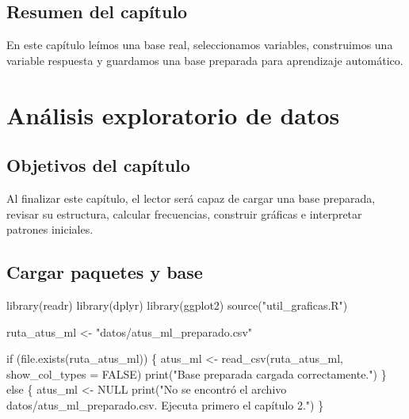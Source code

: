 \documentclass[
  spanish,
  11pt,
  letterpaper,
]{book}
\newenvironment{Shaded}{}{}
\newcommand{\AttributeTok}[1]{\textcolor[rgb]{0.84,0.23,0.29}{#1}}
\newcommand{\ConstantTok}[1]{\textcolor[rgb]{0.00,0.36,0.77}{#1}}
\newcommand{\ControlFlowTok}[1]{\textcolor[rgb]{0.84,0.23,0.29}{#1}}
\newcommand{\FunctionTok}[1]{\textcolor[rgb]{0.44,0.26,0.76}{#1}}
\newcommand{\NormalTok}[1]{\textcolor[rgb]{0.14,0.16,0.18}{#1}}
\newcommand{\OtherTok}[1]{\textcolor[rgb]{0.44,0.26,0.76}{#1}}
\newcommand{\StringTok}[1]{\textcolor[rgb]{0.01,0.18,0.38}{#1}}
\begin{document}
\section{Resumen del capítulo}\label{resumen-del-capuxedtulo}

En este capítulo leímos una base real, seleccionamos variables,
construimos una variable respuesta y guardamos una base preparada para
aprendizaje automático.


\chapter{Análisis exploratorio de
datos}\label{anuxe1lisis-exploratorio-de-datos}

\section{Objetivos del capítulo}\label{objetivos-del-capuxedtulo-2}

Al finalizar este capítulo, el lector será capaz de cargar una base
preparada, revisar su estructura, calcular frecuencias, construir
gráficas e interpretar patrones iniciales.

\section{Cargar paquetes y base}\label{cargar-paquetes-y-base}

\begin{Shaded}
\begin{Highlighting}[]
\FunctionTok{library}\NormalTok{(readr)}
\FunctionTok{library}\NormalTok{(dplyr)}
\FunctionTok{library}\NormalTok{(ggplot2)}
\FunctionTok{source}\NormalTok{(}\StringTok{"util\_graficas.R"}\NormalTok{)}

\NormalTok{ruta\_atus\_ml }\OtherTok{\textless{}{-}} \StringTok{"datos/atus\_ml\_preparado.csv"}

\ControlFlowTok{if}\NormalTok{ (}\FunctionTok{file.exists}\NormalTok{(ruta\_atus\_ml)) \{}
\NormalTok{  atus\_ml }\OtherTok{\textless{}{-}} \FunctionTok{read\_csv}\NormalTok{(ruta\_atus\_ml, }\AttributeTok{show\_col\_types =} \ConstantTok{FALSE}\NormalTok{)}
  \FunctionTok{print}\NormalTok{(}\StringTok{"Base preparada cargada correctamente."}\NormalTok{)}
\NormalTok{\} }\ControlFlowTok{else}\NormalTok{ \{}
\NormalTok{  atus\_ml }\OtherTok{\textless{}{-}} \ConstantTok{NULL}
  \FunctionTok{print}\NormalTok{(}\StringTok{"No se encontró el archivo datos/atus\_ml\_preparado.csv. Ejecuta primero el capítulo 2."}\NormalTok{)}
\NormalTok{\}}
\end{Highlighting}
\end{Shaded}
\end{document}
